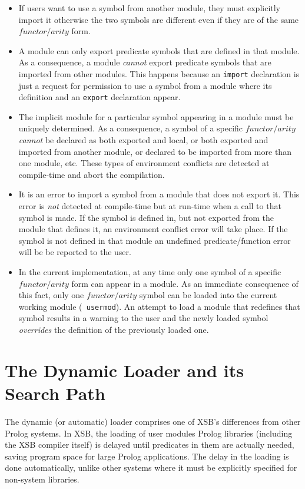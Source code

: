 \begin{itemize}
\item   If users want to use a symbol from another module, they must
        explicitly import it otherwise the two symbols are different
        even if they are of the same $functor/arity$ form.
\item	A module can only export predicate symbols that are defined in
        that module.  As a consequence, a module {\em cannot} export
        predicate symbols that are imported from other modules.
        This happens because an {\tt import} declaration is just a
        request for permission to use a symbol from a module where
        its definition and an {\tt export} declaration appear.
\item   The implicit module for a particular symbol appearing in a
        module must be uniquely determined.  As a consequence, a
        symbol of a specific $functor/arity$ {\em cannot} be declared
        as both exported and local, or both exported and imported from
        another module, or declared to be imported from more than one
        module, etc.  These types of environment conflicts are
        detected at compile-time and abort the compilation.
\item   It is an error to import a symbol from a module that does not
        export it.  This error is {\em not\/} detected at compile-time
        but at run-time when a call to that symbol is made.  If the
        symbol is defined in, but not exported from the module that
	defines it, an environment conflict error will take place.
	If the symbol is not defined in that module an undefined
	predicate/function error will be be reported to the user.
\item   In the current implementation, at any time only one symbol of
        a specific $functor/arity$ form can appear in a module.  As an
        immediate consequence of this fact, only one $functor/arity$
        symbol can be loaded into the current working module ({\tt
        usermod}).  An attempt to load a module that redefines that
        symbol results in a warning to the user and the newly loaded
        symbol {\em overrides} the definition of the previously loaded
        one.
\end{itemize}

\section{The Dynamic Loader and its Search Path} \label{LibPath}
The dynamic (or automatic) loader comprises one of XSB's 
differences from other Prolog systems.
In XSB, the loading of user modules Prolog libraries (including
the XSB compiler itself) is delayed until predicates in them
are actually needed, saving program space for large Prolog
applications.  The delay in the loading is done automatically, unlike
other systems where it must be explicitly specified for non-system
libraries.

